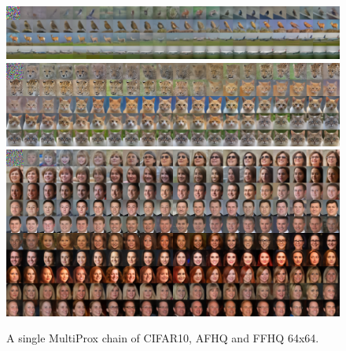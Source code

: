 \begin{figure}[H]
    \centering
    \includegraphics[width=0.49\linewidth]{figures/multiprox/cifar10.png}
    \includegraphics[width=0.49\linewidth]{figures/multiprox/afhq.png}
\includegraphics[width=0.75\linewidth]{figures/multiprox/ffhq.png}
    \caption{A single MultiProx chain of CIFAR10, AFHQ and FFHQ 64x64.}
    \label{fig:multiprox_images}

\end{figure} 





